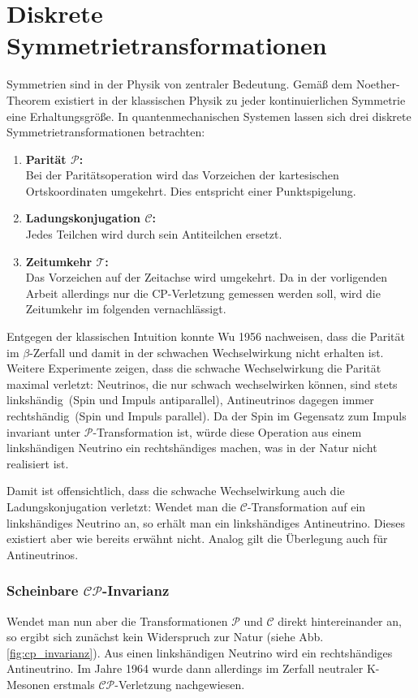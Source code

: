 \section{Diskrete Symmetrietransformationen}
Symmetrien sind in der Physik von zentraler Bedeutung. Gemäß dem Noether-Theorem existiert in der klassischen Physik zu jeder kontinuierlichen Symmetrie eine Erhaltungsgröße. In quantenmechanischen Systemen lassen sich drei diskrete Symmetrietransformationen betrachten:
\begin{enumerate}
\item \textbf{Parität $\mathcal{P}$:} \\
      Bei der Paritätsoperation wird das Vorzeichen der kartesischen Ortskoordinaten umgekehrt. Dies entspricht einer Punktspigelung.
\item \textbf{Ladungskonjugation $\mathcal{C}$:} \\
      Jedes Teilchen wird durch sein Antiteilchen ersetzt.
\item \textbf{Zeitumkehr $\mathcal{T}$:} \\
      Das Vorzeichen auf der Zeitachse wird umgekehrt. Da in der vorligenden Arbeit allerdings nur die CP-Verletzung gemessen werden soll, wird die Zeitumkehr im folgenden vernachlässigt.
\end{enumerate}
Entgegen der klassischen Intuition konnte Wu 1956 nachweisen, dass die Parität im $\beta$-Zerfall und damit in der schwachen Wechselwirkung nicht erhalten ist. Weitere Experimente zeigen, dass die schwache Wechselwirkung die Parität maximal verletzt: Neutrinos, die nur schwach wechselwirken können, sind stets \glqq linkshändig\grqq\ (Spin und Impuls antiparallel), Antineutrinos dagegen immer \glqq rechtshändig\grqq\ (Spin und Impuls parallel). Da der Spin im Gegensatz zum Impuls invariant unter $\mathcal{P}$-Transformation ist, würde diese Operation aus einem linkshändigen Neutrino ein rechtshändiges machen, was in der Natur nicht realisiert ist.

Damit ist offensichtlich, dass die schwache Wechselwirkung auch die Ladungskonjugation verletzt: Wendet man die $\mathcal{C}$-Transformation auf ein linkshändiges Neutrino an, so erhält man ein linkshändiges Antineutrino. Dieses existiert aber wie bereits erwähnt nicht. Analog gilt die Überlegung auch für Antineutrinos.

\subsubsection{Scheinbare $\mathcal{CP}$-Invarianz}
Wendet man nun aber die Transformationen $\mathcal{P}$ und $\mathcal{C}$ direkt hintereinander an, so ergibt sich zunächst kein Widerspruch zur Natur (siehe Abb. \ref{fig:cp_invarianz}). Aus einen linkshändigen Neutrino wird ein rechtshändiges Antineutrino. Im Jahre 1964 wurde dann allerdings im Zerfall neutraler K-Mesonen erstmals $\mathcal{CP}$-Verletzung nachgewiesen. \cite{kleinknecht}

